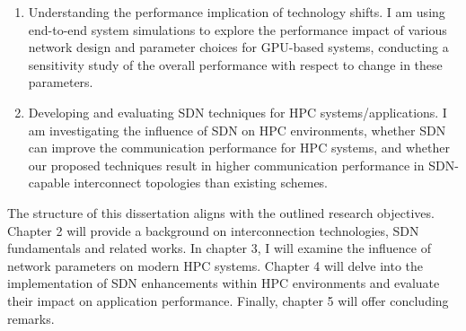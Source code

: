 \begin{enumerate} 
\item Understanding the performance implication of technology shifts.
I am using end-to-end system simulations to explore the
performance impact of various network design and parameter choices for
GPU-based systems,
conducting a sensitivity study of the overall performance with respect to
 change in these parameters.  
\item Developing and evaluating SDN techniques for HPC systems/applications.
I am investigating the influence of SDN on HPC
environments, whether SDN can improve the communication performance for HPC
systems, and whether our proposed techniques result in higher communication
performance in SDN-capable interconnect topologies than existing schemes.
\end{enumerate} 



The structure of this dissertation aligns with the outlined research
objectives.
Chapter 2 will provide a background on interconnection technologies, 
SDN fundamentals and related works. In chapter 3, I will examine the
influence of network parameters on modern HPC systems. Chapter 4 will
delve into
the implementation of SDN enhancements within HPC environments and evaluate
their impact on application performance. Finally, chapter 5 will offer
concluding remarks.

